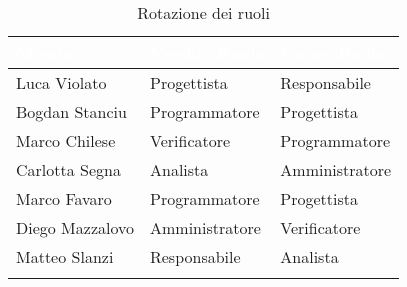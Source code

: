 \begin{center}
	\begin{longtable}[c]{|m{}|m{}|m{}|} 
		\hline
		\rowcolor{bluelogo}\textbf{\textcolor{white}{Membro}} & \textbf{\textcolor{white}{Vecchio Ruolo}} & \textbf{\textcolor{white}{Nuovo Ruolo}}\\
		\hline
		\hline
		Luca Violato & Progettista & Responsabile \\
		\hline
		\rowcolor{grigio}Bogdan Stanciu & Programmatore & Progettista \\
		\hline
		Marco Chilese & Verificatore & Programmatore	\\
		\hline
		\rowcolor{grigio}Carlotta Segna & Analista & Amministratore\\
		\hline
		Marco Favaro & Programmatore & Progettista \\
		\hline
		\rowcolor{grigio} Diego Mazzalovo & Amministratore & Verificatore\\
		\hline
		Matteo Slanzi & Responsabile & Analista\\
		\hline
		\caption{Rotazione dei ruoli}
	\end{longtable}
	
\end{center}
